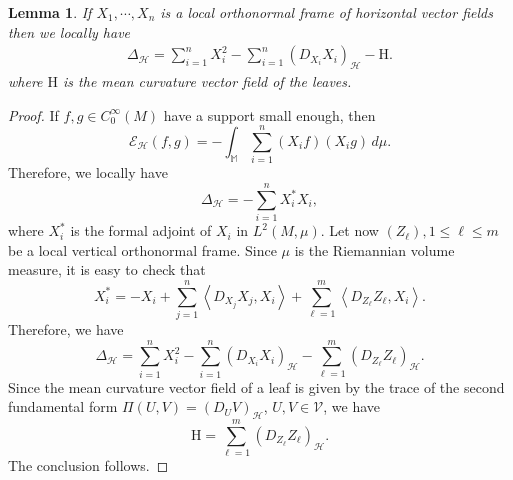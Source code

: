 \documentclass[11pt]{article}
\numberwithin{equation}{section}
\newtheorem{lemma}[theorem]{Lemma}
\newcommand{\bM}{\mathbb M}
\newcommand{\Ho}{\mathcal H}
\newcommand{\V}{\mathcal V}
\begin{document}
	
   

    \begin{lemma}\label{formula horizontal laplacian}
If $X_1,\cdots,X_n$ is a local orthonormal frame of horizontal vector fields then we locally have
\begin{align}\label{def: horizontal laplace}
		\Delta_{\mathcal{H}}=\sum_{i=1}^n X_i^2 -\sum_{i=1}^n (D_{X_i}X_i)_{\mathcal{H}}-\mathrm H.
	\end{align}
    where $\mathrm H$ is the mean curvature vector field of the leaves.
    \end{lemma}
\begin{proof}
If $f,g\in C_0^\infty(M)$ have a support small enough, then
\[
\mathcal{E}_{\mathcal{H}} (f,g) 
	=-\int_\bM \sum_{i=1}^n (X_i f)(X_ig) \,d\mu.
\]
Therefore, we locally have
\[
\Delta_{\mathcal{H}}=-\sum_{i=1}^n X_i^*X_i,
\]
where $X_i^*$ is the formal adjoint of $X_i$ in $L^2(M,\mu)$. Let now $(Z_\ell), 1 \le \ell \le m$ be a local vertical orthonormal frame. Since $\mu$ is the Riemannian volume measure, it is  easy to check that
\[
X_i^*=-X_i+\sum_{j=1}^n \left\langle D_{X_j}X_j,X_i \right\rangle+\sum_{\ell=1}^m\left\langle D_{Z_\ell} Z_\ell ,X_i \right\rangle.
\]
Therefore,  we have
\[
\Delta_{\mathcal{H}}=\sum_{i=1}^n X_i^2 -\sum_{i=1}^n (D_{X_i}X_i)_{\mathcal{H}}-\sum_{\ell=1}^m (D_{Z_\ell} Z_\ell)_\mathcal{H}.
\]
Since the mean curvature vector field of a leaf is given by the trace of the second fundamental form $\Pi(U,V)=(D_U V)_\Ho$, $U,V\in \V$, we have
\[
\mathrm H=\sum_{\ell=1}^m (D_{Z_\ell} Z_\ell)_\mathcal{H}.
\]
The conclusion follows.
\end{proof}
\end{document}
